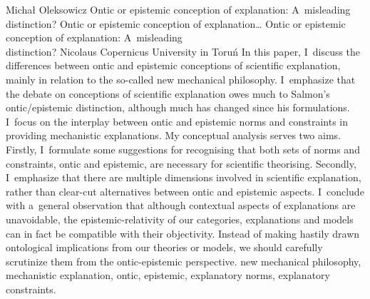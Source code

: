 \begin{artengenv}{Michał Oleksowicz}
	{Ontic or epistemic conception of explanation: A~misleading distinction?}
	{Ontic or epistemic conception of explanation\ldots}
	{Ontic or epistemic conception of explanation: A~misleading\\distinction?}
	{Nicolaus Copernicus University in Toruń}
	{In this paper, I~discuss the differences between ontic and epistemic conceptions of scientific explanation, mainly in relation to the so-called new mechanical philosophy. I~emphasize that the debate on conceptions of scientific explanation owes much to Salmon's ontic/epistemic distinction, although much has changed since his formulations. I~focus on the interplay between ontic and epistemic norms and constraints in providing mechanistic explanations. My conceptual analysis serves two aims. Firstly, I~formulate some suggestions for recognising that both sets of norms and constraints, ontic and epistemic, are necessary for scientific theorising. Secondly, I~emphasize that there are multiple dimensions involved in scientific explanation, rather than clear-cut alternatives between ontic and epistemic aspects. I~conclude with a~general observation that although contextual aspects of explanations are unavoidable, the epistemic-relativity of our categories, explanations and models can in fact be compatible with their objectivity. Instead of making hastily drawn ontological implications from our theories or models, we should carefully scrutinize them from the ontic-epistemic perspective.
	}
	{new mechanical philosophy, mechanistic explanation, ontic, epistemic, explanatory norms, explanatory constraints.}




\end{artengenv}

